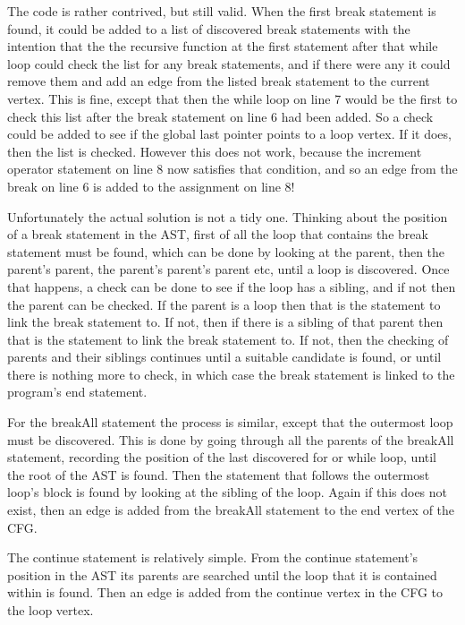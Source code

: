 

The code is rather contrived, but still valid. When the first break statement is found, it could be added to a list of discovered break statements with the intention that the the recursive function at the first statement after that while loop could check the list for any break statements, and if there were any it could remove them and add an edge from the listed break statement to the current vertex. This is fine, except that then the while loop on line 7 would be the first to check this list after the break statement on line 6 had been added. So a check could be added to see if the global last pointer points to a loop vertex. If it does, then the list is checked. However this does not work, because the increment operator statement on line 8 now satisfies that condition, and so an edge from the break on line 6 is added to the assignment on line 8! 

Unfortunately the actual solution is not a tidy one. Thinking about the position of a break statement in the AST, first of all the loop that contains the break statement must be found, which can be done by looking at the parent, then the parent's parent, the parent's parent's parent etc, until a loop is discovered. Once that happens, a check can be done to see if the loop has a sibling, and if not then the parent can be checked. If the parent is a loop then that is the statement to link the break statement to. If not, then if there is a sibling of that parent then that is the statement to link the break statement to. If not, then the checking of parents and their siblings continues until a suitable candidate is found, or until there is nothing more to check, in which case the break statement is linked to the program's end statement.

For the breakAll statement the process is similar, except that the outermost loop must be discovered. This is done by going through all the parents of the breakAll statement, recording the position of the last discovered for or while loop, until the root of the AST is found. Then the statement that follows the outermost loop's block is found by looking at the sibling of the loop. Again if this does not exist, then an edge is added from the breakAll statement to the end vertex of the CFG.

The continue statement is relatively simple. From the continue statement's position in the AST its parents are searched until the loop that it is contained within is found. Then an edge is added from the continue vertex in the CFG to the loop vertex. 

